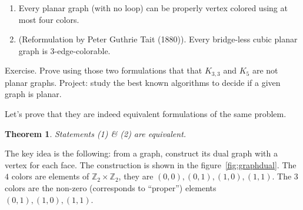 \documentclass[12pt,a4paper]{article}
\def\Z{\mathbb{Z}}
\newtheorem{theorem}{Theorem}
\begin{document}
\begin{enumerate}
\item Every planar graph (with no loop) can be properly vertex colored using at
most four colors.
\item (Reformulation by Peter Guthrie Tait (1880)). Every bridge-less cubic
  planar graph is 3-edge-colorable.
\end{enumerate}

Exercise. Prove using those two formulations that that \(K_{3,3}\) and \(K_5\)
are not planar graphs.  Project: study the best known algorithms to decide if a
given graph is planar.

Let's prove that they are indeed equivalent formulations of the same problem.
\begin{theorem}
  Statements (1) \& (2) are equivalent.
\end{theorem}

The key idea is the following: from a graph, construct its dual graph with a
vertex for each face.  The construction is shown in the
figure~\ref{fig:graphdual}. The \(4\) colors are elements of
\(\Z_2 \times \Z_2\), they are \((0, 0), (0, 1), (1, 0), (1, 1)\).  The \(3\)
colors are the non-zero (corresponds to \enquote{proper}) elements
\((0, 1), (1, 0), (1, 1)\).
\end{document}
